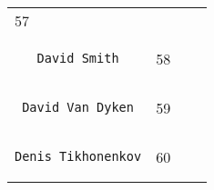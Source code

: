 \documentclass[]{article}
\begin{document}
\begin{longtable}[c]{@{}llll@{}}
\begin{minipage}[t]{0.10\columnwidth}
57
\end{minipage} & \begin{minipage}[t]{0.13\columnwidth}\raggedright
\end{minipage} & \begin{minipage}[t]{0.15\columnwidth}\raggedright
\end{minipage}
\\\noalign{\medskip}
\begin{minipage}[t]{0.39\columnwidth}\raggedright
\begin{verbatim}
   David Smith
\end{verbatim}
\end{minipage} & \begin{minipage}[t]{0.10\columnwidth}\raggedright
58
\end{minipage} & \begin{minipage}[t]{0.13\columnwidth}\raggedright
\end{minipage} & \begin{minipage}[t]{0.15\columnwidth}\raggedright
\end{minipage}
\\\noalign{\medskip}
\begin{minipage}[t]{0.39\columnwidth}\raggedright
\begin{verbatim}
 David Van Dyken
\end{verbatim}
\end{minipage} & \begin{minipage}[t]{0.10\columnwidth}\raggedright
59
\end{minipage} & \begin{minipage}[t]{0.13\columnwidth}\raggedright
\end{minipage} & \begin{minipage}[t]{0.15\columnwidth}\raggedright
\end{minipage}
\\\noalign{\medskip}
\begin{minipage}[t]{0.39\columnwidth}\raggedright
\begin{verbatim}
Denis Tikhonenkov
\end{verbatim}
\end{minipage} & \begin{minipage}[t]{0.10\columnwidth}\raggedright
60
\end{minipage} & \begin{minipage}[t]{0.13\columnwidth}\raggedright
\end{minipage} & \begin{minipage}[t]{0.15\columnwidth}\raggedright

\end{minipage}
\end{longtable}
\end{document}
